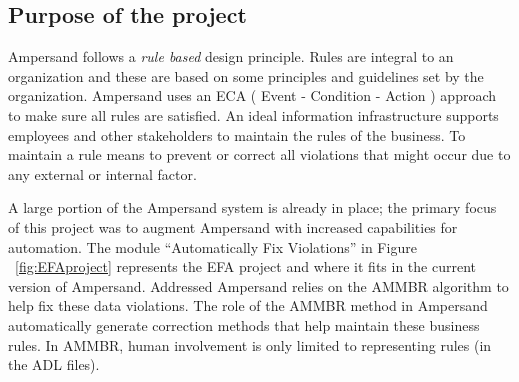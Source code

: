 %

\subsection{Purpose of the project}

Ampersand follows a \emph{rule based} design principle. Rules are integral to an organization
and these are based on some principles and guidelines set by the organization.
Ampersand uses an ECA ( Event - Condition - Action ) approach to make sure all rules are satisfied. An ideal information infrastructure supports employees and other stakeholders to maintain the rules of the business. To maintain a rule means to prevent or correct all violations that might occur due to any external or internal factor.
 
 A large portion of the Ampersand system is already in place; the primary focus of this project was to
augment Ampersand with increased capabilities for automation. The module ``Automatically Fix Violations'' in Figure ~\ref{fig:EFAproject} represents the EFA project and where it fits in the current version of Ampersand.
  {Addressed}
Ampersand relies on the AMMBR \citep{Ampersand} algorithm to help fix these data violations.
The role 
of the AMMBR method in Ampersand  automatically generate correction methods that 
help maintain these business rules. In AMMBR, human involvement is only limited 
to representing rules (in the ADL files).

